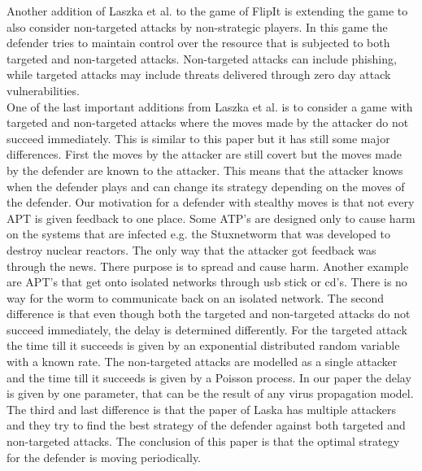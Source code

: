 Another addition of Laszka et al. to the game of FlipIt \cite{MitigationCovert} 
is extending the game to also consider non-targeted attacks by non-strategic players. In this game the defender tries to maintain control over the resource that is subjected to both targeted and non-targeted attacks. Non-targeted attacks can include phishing, while targeted attacks may include threats delivered through zero day attack vulnerabilities. \\
One of the last important additions from Laszka et al. \cite{MitigationNonTargeted} is to consider a game with targeted and non-targeted attacks where the moves made by the attacker do not succeed immediately. This is similar to this paper but it has still some major differences. First the moves by the attacker are still covert but the moves made by the defender are known to the attacker. This means that the attacker knows when the defender plays and can change its strategy depending on the moves of the defender. Our motivation for a defender with stealthy moves is that not every APT is given feedback to one place. Some ATP's are designed only to cause harm on the systems that are infected e.g. the Stuxnetworm that was developed to destroy nuclear reactors. The only way that the attacker got feedback was through the news. There purpose is to spread and cause harm. Another example are APT's that get onto isolated networks through usb stick or cd's. There is no way for the worm to communicate back on an isolated network. The second difference is that even though both the targeted and non-targeted attacks do not succeed immediately, the delay is determined differently. For the targeted attack the time till it succeeds is given by an exponential distributed random variable with a known rate. The non-targeted attacks are modelled as a single attacker and the time till it succeeds is given by a Poisson process. In our paper the delay is given by one parameter, that can be the result of any virus propagation model. The third and last difference is that the paper of Laska has multiple attackers and they try to find the best strategy of the defender against both targeted and non-targeted attacks. The conclusion of this paper is that the optimal strategy for the defender is moving periodically. \\ 

